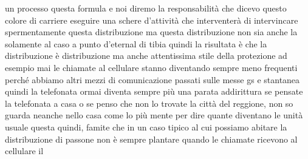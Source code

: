 un processo questa formula e noi diremo la responsabilità che dicevo questo colore di carriere eseguire una schere d'attività che interventerà di intervincare spermentamente questa distribuzione ma questa distribuzione non sia anche la solamente al caso a punto d'eternal di tibia quindi la risultata è che la distribuzione è distribuzione ma anche attentissima stile della protezione ad esempio mai le chiamate al cellulare stanno diventando sempre meno frequenti perché abbiamo altri mezzi di comunicazione passati sulle messe gs e stantanea quindi la telefonata ormai diventa sempre più una parata addirittura se pensate la telefonata a casa o se penso che non lo trovate la città del reggione, non so guarda neanche nello casa come lo più mente per dire quante diventano le unità usuale questa quindi, famite che in un caso tipico al cui possiamo abitare la distribuzione di passone non è sempre plantare quando le chiamate ricevono al cellulare il 

